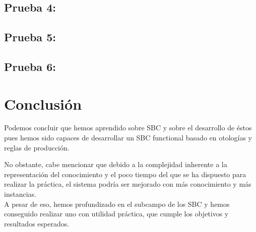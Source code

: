 \documentclass[12]{article}
\begin{document}
\subsection{Prueba 4: }


\subsection{Prueba 5: }


\subsection{Prueba 6: }


\section{Conclusión}
Podemos concluir que hemos aprendido sobre SBC y sobre el desarrollo de éstos pues hemos sido capaces de desarrollar un SBC functional basado en otologías y reglas de producción.

No obstante, cabe mencionar que debido a la complejidad inherente a la representación del conocimiento y el poco tiempo del que se ha dispuesto para realizar la práctica, el sistema podría ser mejorado con más conocimiento y más instancias. 
\\

A pesar de eso, hemos profundizado en el subcampo de los SBC y hemos conseguido realizar uno con utilidad práctica, que cumple los objetivos y resultados esperados.
\end{document}
